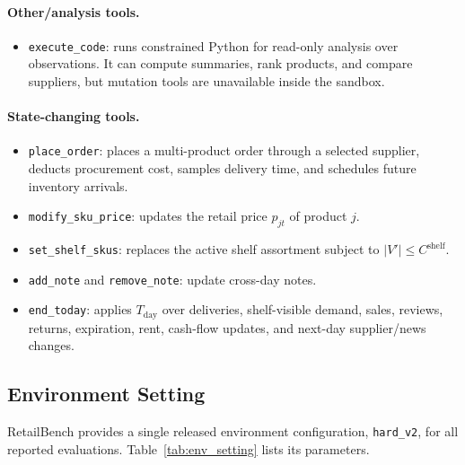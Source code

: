 \paragraph{Other/analysis tools.}
\begin{itemize}[leftmargin=*,nosep]
    \item \texttt{execute\_code}: runs constrained Python for read-only analysis over observations. It can compute summaries, rank products, and compare suppliers, but mutation tools are unavailable inside the sandbox.
\end{itemize}

\paragraph{State-changing tools.}
\begin{itemize}[leftmargin=*,nosep]
    \item \texttt{place\_order}: places a multi-product order through a selected supplier, deducts procurement cost, samples delivery time, and schedules future inventory arrivals.
    \item \texttt{modify\_sku\_price}: updates the retail price $p_{jt}$ of product $j$.
    \item \texttt{set\_shelf\_skus}: replaces the active shelf assortment subject to $|V'|\le C^{\mathrm{shelf}}$.
    \item \texttt{add\_note} and \texttt{remove\_note}: update cross-day notes.
    \item \texttt{end\_today}: applies $T_{\mathrm{day}}$ over deliveries, shelf-visible demand, sales, reviews, returns, expiration, rent, cash-flow updates, and next-day supplier/news changes.
\end{itemize}

\subsection{Environment Setting}
\label{appendix:env_setting}

RetailBench provides a single released environment configuration, \texttt{hard\_v2}, for all reported evaluations. Table~\ref{tab:env_setting} lists its parameters.

